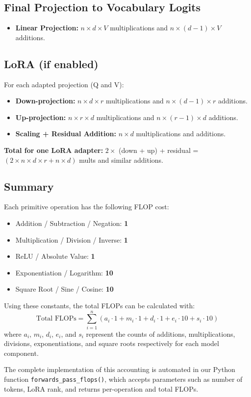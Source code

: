 \documentclass[a4paper,12pt]{article}
\begin{document}
  \subsection*{Final Projection to Vocabulary Logits}
  \begin{itemize}
    \item \textbf{Linear Projection:} $n \times d \times V$ multiplications and $n \times (d - 1) \times V$ additions.
  \end{itemize}
  
  \subsection*{LoRA (if enabled)}
  For each adapted projection (Q and V):
  \begin{itemize}
    \item \textbf{Down-projection:} $n \times d \times r$ multiplications and $n \times (d - 1) \times r$ additions.
    \item \textbf{Up-projection:} $n \times r \times d$ multiplications and $n \times (r - 1) \times d$ additions.
    \item \textbf{Scaling + Residual Addition:} $n \times d$ multiplications and additions.
  \end{itemize}
  \textbf{Total for one LoRA adapter:} $2 \times$ (down + up) + residual = $(2 \times n \times d \times r + n \times d)$ mults and similar additions.
  
  \subsection*{Summary}
  Each primitive operation has the following FLOP cost:
  \begin{itemize}
    \item Addition / Subtraction / Negation: \textbf{1}
    \item Multiplication / Division / Inverse: \textbf{1}
    \item ReLU / Absolute Value: \textbf{1}
    \item Exponentiation / Logarithm: \textbf{10}
    \item Square Root / Sine / Cosine: \textbf{10}
  \end{itemize}
  
  Using these constants, the total FLOPs can be calculated with:
  \begin{equation}
  \text{Total FLOPs} = \sum_{i=1}^{n} \left( a_i \cdot 1 + m_i \cdot 1 + d_i \cdot 1 + e_i \cdot 10 + s_i \cdot 10 \right)
  \end{equation}
  where $a_i$, $m_i$, $d_i$, $e_i$, and $s_i$ represent the counts of additions, multiplications, divisions, exponentiations, and square roots respectively for each model component.
  
  The complete implementation of this accounting is automated in our Python function \texttt{forwards\_pass\_flops()}, which accepts parameters such as number of tokens, LoRA rank, and returns per-operation and total FLOPs.
  




\end{document}
